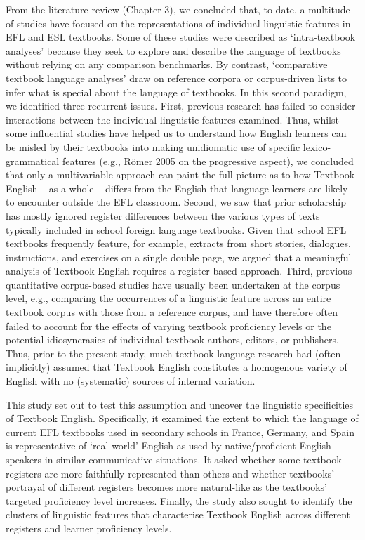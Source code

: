 \documentclass[
  letterpaper,
  DIV=11,
  numbers=noendperiod]{scrreprt}
\begin{document}
From the literature review (Chapter 3), we concluded that, to date, a
multitude of studies have focused on the representations of individual
linguistic features in EFL and ESL textbooks. Some of these studies were
described as `intra-textbook analyses' because they seek to explore and
describe the language of textbooks without relying on any comparison
benchmarks. By contrast, `comparative textbook language analyses' draw
on reference corpora or corpus-driven lists to infer what is special
about the language of textbooks. In this second paradigm, we identified
three recurrent issues. First, previous research has failed to consider
interactions between the individual linguistic features examined. Thus,
whilst some influential studies have helped us to understand how English
learners can be misled by their textbooks into making unidiomatic use of
specific lexico-grammatical features (e.g., Römer 2005 on the
progressive aspect), we concluded that only a multivariable approach can
paint the full picture as to how Textbook English -- as a whole --
differs from the English that language learners are likely to encounter
outside the EFL classroom. Second, we saw that prior scholarship has
mostly ignored register differences between the various types of texts
typically included in school foreign language textbooks. Given that
school EFL textbooks frequently feature, for example, extracts from
short stories, dialogues, instructions, and exercises on a single double
page, we argued that a meaningful analysis of Textbook English requires
a register-based approach. Third, previous quantitative corpus-based
studies have usually been undertaken at the corpus level, e.g.,
comparing the occurrences of a linguistic feature across an entire
textbook corpus with those from a reference corpus, and have therefore
often failed to account for the effects of varying textbook proficiency
levels or the potential idiosyncrasies of individual textbook authors,
editors, or publishers. Thus, prior to the present study, much textbook
language research had (often implicitly) assumed that Textbook English
constitutes a homogenous variety of English with no (systematic) sources
of internal variation.

This study set out to test this assumption and uncover the linguistic
specificities of Textbook English. Specifically, it examined the extent
to which the language of current EFL textbooks used in secondary schools
in France, Germany, and Spain is representative of `real-world' English
as used by native/proficient English speakers in similar communicative
situations. It asked whether some textbook registers are more faithfully
represented than others and whether textbooks' portrayal of different
registers becomes more natural-like as the textbooks' targeted
proficiency level increases. Finally, the study also sought to identify
the clusters of linguistic features that characterise Textbook English
across different registers and learner proficiency levels.
\end{document}
